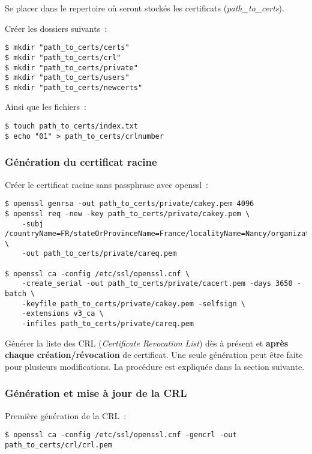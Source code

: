 Se placer dans le repertoire où seront stockés les certificats (\emph{path\_to\_certs}).

Créer les dossiers suivants~:

\begin{lstlisting}
$ mkdir "path_to_certs/certs"
$ mkdir "path_to_certs/crl"
$ mkdir "path_to_certs/private"
$ mkdir "path_to_certs/users"
$ mkdir "path_to_certs/newcerts"
\end{lstlisting}

Ainsi que les fichiers~:

\begin{lstlisting}
$ touch path_to_certs/index.txt
$ echo "01" > path_to_certs/crlnumber
\end{lstlisting}

\subsubsection{Génération du certificat racine}

Créer le certificat racine sans passphrase avec openssl~:

\begin{lstlisting}
$ openssl genrsa -out path_to_certs/private/cakey.pem 4096 
$ openssl req -new -key path_to_certs/private/cakey.pem \
	-subj /countryName=FR/stateOrProvinceName=France/localityName=Nancy/organizationName=BHConsulting/commonName=nom_entreprise/ \
	-out path_to_certs/private/careq.pem

$ openssl ca -config /etc/ssl/openssl.cnf \
	-create_serial -out path_to_certs/private/cacert.pem -days 3650 -batch \
	-keyfile path_to_certs/private/cakey.pem -selfsign \
	-extensions v3_ca \
	-infiles path_to_certs/private/careq.pem
\end{lstlisting}

Générer la liste des CRL (\emph{Certificate Revocation List}) dès à présent et \textbf{après chaque création/révocation} de certificat. Une seule génération peut être faite pour plusieurs modifications. La procédure est expliquée dans la section suivante.

\subsubsection{Génération et mise à jour de la CRL}

Première génération de la CRL~:

\begin{lstlisting}
$ openssl ca -config /etc/ssl/openssl.cnf -gencrl -out path_to_certs/crl/crl.pem
\end{lstlisting}

